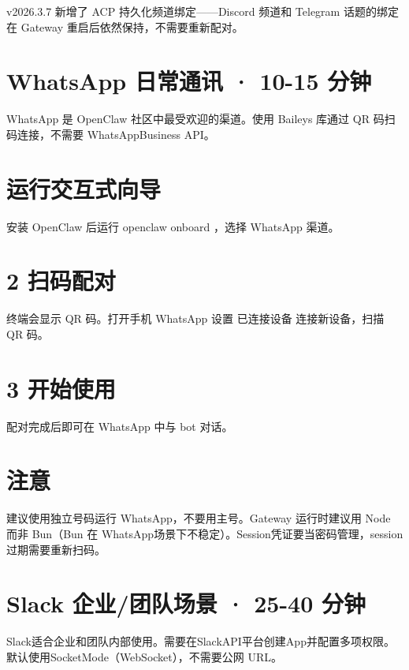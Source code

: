 \documentclass[
  10
]{article}
\begin{document}
v2026.3.7 新增了 ACP 持久化频道绑定------Discord 频道和 Telegram
话题的绑定在 Gateway 重启后依然保持，不需要重新配对。

\section{WhatsApp ⽇常通讯 · 10-15
分钟}\label{whatsapp-ux5e38ux901aux8baf-10-15-ux5206ux949f}

WhatsApp 是 OpenClaw 社区中最受欢迎的渠道。使用 Baileys 库通过 QR
码扫码连接，不需要 WhatsAppBusiness API。

\section{运行交互式向导}\label{ux8fd0ux884cux4ea4ux4e92ux5f0fux5411ux5bfc}

安装 OpenClaw 后运行 openclaw onboard ，选择 WhatsApp 渠道。

\section{2 扫码配对}\label{ux626bux7801ux914dux5bf9}

终端会显示 QR 码。打开手机 WhatsApp 设置 已连接设备 连接新设备，扫描 QR
码。

\section{3 开始使用}\label{ux5f00ux59cbux4f7fux7528}

配对完成后即可在 WhatsApp 中与 bot 对话。

\section{注意}\label{ux6ce8ux610f-6}

建议使用独立号码运行 WhatsApp，不要用主号。Gateway 运行时建议用 Node
而非 Bun（Bun 在
WhatsApp场景下不稳定）。Session凭证要当密码管理，session过期需要重新扫码。

\section{Slack 企业/团队场景 · 25-40
分钟}\label{slack-ux4f01ux4e1aux56e2ux961fux573aux666f-25-40-ux5206ux949f}

Slack适合企业和团队内部使用。需要在SlackAPI平台创建App并配置多项权限。默认使用SocketMode（WebSocket），不需要公网
URL。
\end{document}
